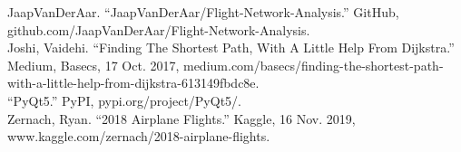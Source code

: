\documentclass[fontsize=11pt]{article}
\begin{document}
\noindent
JaapVanDerAar. “JaapVanDerAar/Flight-Network-Analysis.” GitHub, github.com/JaapVanDerAar/Flight-Network-Analysis.\\

\noindent
Joshi, Vaidehi. “Finding The Shortest Path, With A Little Help From Dijkstra.” Medium, Basecs, 17 Oct. 2017, medium.com/basecs/finding-the-shortest-path-with-a-little-help-from-dijkstra-613149fbdc8e.\\

\noindent
“PyQt5.” PyPI, pypi.org/project/PyQt5/.\\

\noindent
Zernach, Ryan. “2018 Airplane Flights.” Kaggle, 16 Nov. 2019, www.kaggle.com/zernach/2018-airplane-flights.\\
\end{document}
